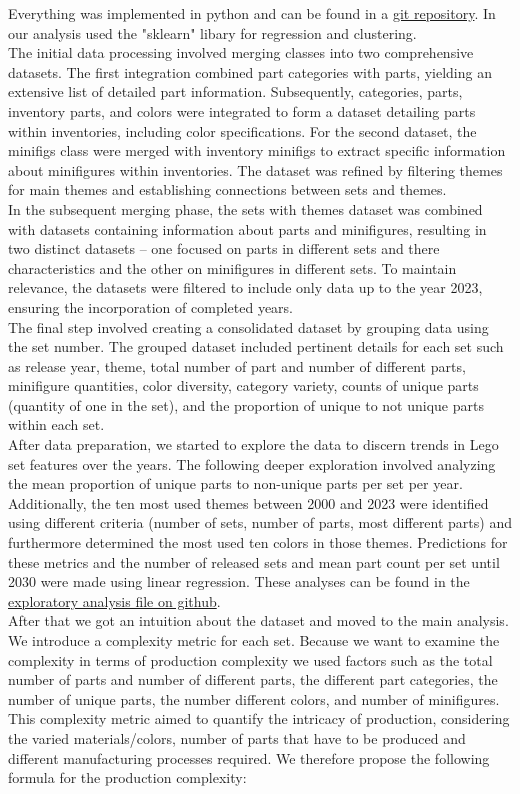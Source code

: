 \documentclass{article}
\theoremstyle{plain}
\theoremstyle{definition}
\theoremstyle{remark}
\begin{document}
Everything was implemented in python and can be found in a \href{https://github.com/eddiebeach99/Data_Literacy/tree/main}{git repository}. In our analysis used the "sklearn" libary for regression and clustering. \\
The initial data processing involved merging classes into two comprehensive datasets. The first integration combined part categories with parts, yielding an extensive list of detailed part information. Subsequently, categories, parts, inventory parts, and colors were integrated to form a dataset detailing parts within inventories, including color specifications. For the second dataset, the minifigs class were merged with inventory minifigs to extract specific information about minifigures within inventories. The dataset was refined by filtering themes for main themes and establishing connections between sets and themes.\\
In the subsequent merging phase, the sets with themes dataset was combined with datasets containing information about parts and minifigures, resulting in two distinct datasets – one focused on parts in different sets and there characteristics and the other on minifigures in different sets. To maintain relevance, the datasets were filtered to include only data up to the year 2023, ensuring the incorporation of completed years.\\
The final step involved creating a consolidated dataset by grouping data using the set number. The grouped dataset included pertinent details for each set such as release year, theme, total number of part and number of different parts, minifigure quantities, color diversity, category variety, counts of unique parts (quantity of one in the set), and the proportion of unique to not unique parts within each set.\\
After data preparation, we started to explore the data to discern trends in Lego set features over the years. The following deeper exploration involved analyzing the mean proportion of unique parts to non-unique parts per set per year. Additionally, the ten most used themes between 2000 and 2023 were identified using different criteria (number of sets, number of parts, most different parts) and furthermore determined the most used ten colors in those themes. Predictions for these metrics and the number of released sets and mean part count per set until 2030 were made using linear regression. These analyses can be found in the \href{https://github.com/eddiebeach99/Data_Literacy/blob/main/Analysis/exploratory_analysis.ipynb}{exploratory analysis file on github}. \\
After that we got an intuition about the dataset and moved to the main analysis. We introduce a complexity metric for each set. Because we want to examine the complexity in terms of production complexity we used factors such as the total number of parts and number of different parts, the different part categories, the number of unique parts, the number different colors, and number of minifigures. This complexity metric aimed to quantify the intricacy of production, considering the varied materials/colors, number of parts that have to be produced and different manufacturing processes required. We therefore propose the following formula for the production complexity:
\end{document}
